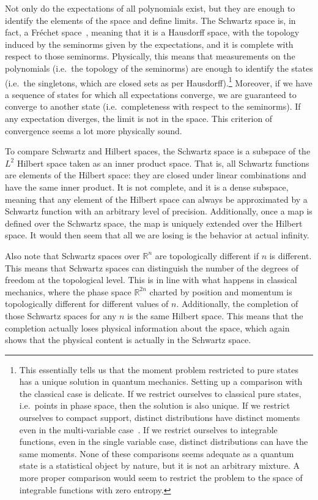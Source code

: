 \documentclass[10pt,twocolumn, nofootinbib]{revtex4-2}
\begin{document}
Not only do the expectations of all polynomials exist, but they are enough to identify the elements of the space and define limits. The Schwartz space is, in fact, a Fréchet space~\cite[Theorem V.9]{reed_methods_1980}, meaning that it is a Hausdorff space, with the topology induced by the seminorms given by the expectations, and it is complete with respect to those seminorms. Physically, this means that measurements on the polynomials (i.e.~the topology of the seminorms) are enough to identify the states (i.e.~the singletons, which are closed sets as per Hausdorff).\footnote{This essentially tells us that the moment problem restricted to pure states has a unique solution in quantum mechanics. Setting up a comparison with the classical case is delicate. If we restrict ourselves to classical pure states, i.e.~points in phase space, then the solution is also unique. If we restrict ourselves to compact support, distinct distributions have distinct moments even in the multi-variable case~\cite{moment_problem_2017}. If we restrict ourselves to integrable functions, even in the single variable case, distinct distributions can have the same moments. None of these comparisons seems adequate as a quantum state is a statistical object by nature, but it is not an arbitrary mixture. A more proper comparison would seem to restrict the problem to the space of integrable functions with zero entropy.} Moreover, if we have a sequence of states for which all expectations converge, we are guaranteed to converge to another state (i.e.~completeness with respect to the seminorms). If any expectation diverges, the limit is not in the space. This criterion of convergence seems a lot more physically sound.

To compare Schwartz and Hilbert spaces, the Schwartz space is a subspace of the $L^2$ Hilbert space taken as an inner product space. That is, all Schwartz functions are elements of the Hilbert space: they are closed under linear combinations and have the same inner product. It is not complete, and it is a dense subspace, meaning that any element of the Hilbert space can always be approximated by a Schwartz function with an arbitrary level of precision. Additionally, once a map is defined over the Schwartz space, the map is uniquely extended over the Hilbert space. It would then seem that all we are losing is the behavior at actual infinity.

Also note that Schwartz spaces over $\mathbb{R}^n$ are topologically different if $n$ is different. This means that Schwartz spaces can distinguish the number of the degrees of freedom at the topological level. This is in line with what happens in classical mechanics, where the phase space $\mathbb{R}^{2n}$ charted by position and momentum is topologically different for different values of $n$. Additionally, the completion of those Schwartz spaces for any $n$ is the same Hilbert space. This means that the completion actually loses physical information about the space, which again shows that the physical content is actually in the Schwartz space.
\end{document}
